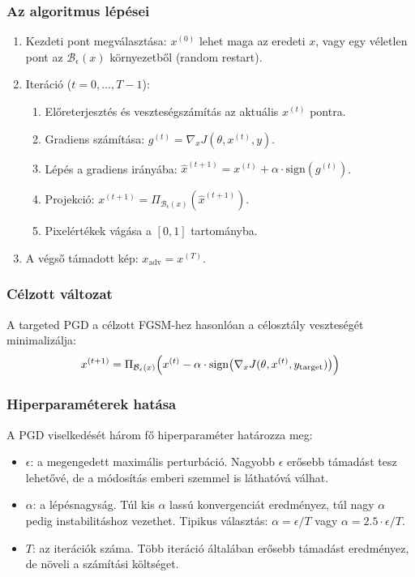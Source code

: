 \documentclass[12pt,a4paper]{article}
\begin{document}
\subsubsection{Az algoritmus lépései}

\begin{enumerate}
  \item Kezdeti pont megválasztása: $x^{(0)}$ lehet maga az eredeti $x$, vagy egy véletlen pont az
        $\mathcal{B}_\epsilon(x)$ környezetből (random restart).
  \item Iteráció ($t = 0, \ldots, T-1$):
    \begin{enumerate}
      \item Előreterjesztés és veszteségszámítás az aktuális $x^{(t)}$ pontra.
      \item Gradiens számítása: $g^{(t)} = \nabla_x J(\theta, x^{(t)}, y)$.
      \item Lépés a gradiens irányába: $\hat{x}^{(t+1)} = x^{(t)} + \alpha \cdot \mathrm{sign}(g^{(t)})$.
      \item Projekció: $x^{(t+1)} = \Pi_{\mathcal{B}_\epsilon(x)}(\hat{x}^{(t+1)})$.
      \item Pixelértékek vágása a $[0, 1]$ tartományba.
    \end{enumerate}
  \item A végső támadott kép: $x_{\mathrm{adv}} = x^{(T)}$.
\end{enumerate}

\subsubsection{Célzott változat}

A targeted PGD a célzott FGSM-hez hasonlóan a célosztály veszteségét minimalizálja:
\[
  x^{(t+1)} = \Pi_{\mathcal{B}_\epsilon(x)} \Bigl(
    x^{(t)} - \alpha \cdot \mathrm{sign}\bigl(\nabla_x J(\theta, x^{(t)}, y_{\mathrm{target}})\bigr)
  \Bigr)
\]

\subsubsection{Hiperparaméterek hatása}

A PGD viselkedését három fő hiperparaméter határozza meg:
\begin{itemize}
  \item $\epsilon$: a megengedett maximális perturbáció. Nagyobb $\epsilon$ erősebb támadást tesz lehetővé,
        de a módosítás emberi szemmel is láthatóvá válhat.
  \item $\alpha$: a lépésnagyság. Túl kis $\alpha$ lassú konvergenciát eredményez, túl nagy $\alpha$ pedig
        instabilitáshoz vezethet. Tipikus választás: $\alpha = \epsilon / T$ vagy $\alpha = 2.5 \cdot \epsilon / T$.
  \item $T$: az iterációk száma. Több iteráció általában erősebb támadást eredményez, de növeli a
        számítási költséget.
\end{itemize}
\end{document}
